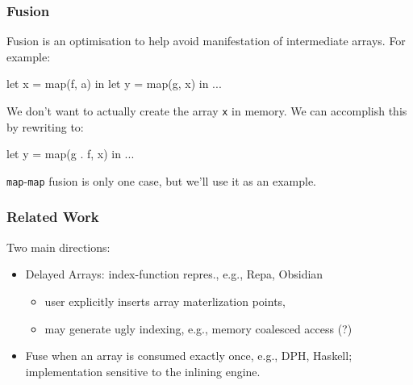 \documentclass{beamer}
\begin{document}
\begin{frame}[fragile,t]
  \frametitle{Fusion}

  Fusion is an optimisation to help avoid manifestation of
  intermediate arrays.  For example:

  \begin{colorcode}
    let x = map(f, a) in
    let y = map(g, x) in
    ...
  \end{colorcode}

\pause

We don't want to actually create the array {\tt x} in memory.  We can
accomplish this by rewriting to:

  \begin{colorcode}
    let y = map(g . f, x) in
    ...
  \end{colorcode}

  {\tt map}-{\tt map} fusion is only one case, but we'll use it as an
  example.
\end{frame}

\begin{frame}
\frametitle{Related Work}

Two main directions:\bigskip
\begin{itemize}
    \item Delayed Arrays: index-function repres., e.g., Repa, Obsidian\smallskip
            \begin{itemize}
                \item user explicitly inserts array materlization points,\smallskip
                \item may generate ugly indexing, e.g., memory coalesced access (?)\bigskip
            \end{itemize}

    \item Fuse when an array is consumed exactly once, e.g., DPH, Haskell;
            implementation sensitive to the inlining engine.


\end{itemize}
\end{frame}
\end{document}

